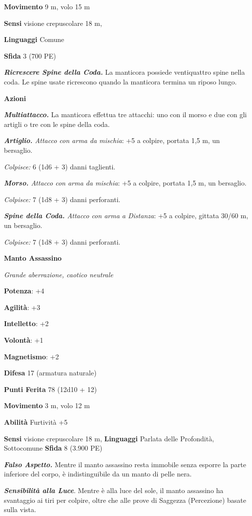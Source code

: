 \begin{multicols}{2}
\textbf{Movimento} 9 m, volo 15 m

\textbf{Sensi} visione crepuscolare 18 m, 

\textbf{Linguaggi} Comune

\textbf{Sfida} 3 (700 PE)

\emph{\textbf{Ricrescere Spine della Coda.}} La manticora possiede
ventiquattro spine nella coda. Le spine usate ricrescono quando la
manticora termina un riposo lungo.

\textbf{Azioni}

\emph{\textbf{Multiattacco.}} La manticora effettua tre attacchi: uno
con il morso e due con gli artigli o tre con le spine della coda.

\emph{\textbf{Artiglio.} Attacco con arma da mischia}: +5 a colpire,
portata 1,5 m, un bersaglio.

\emph{Colpisce:} 6 (1d6 + 3) danni taglienti.

\emph{\textbf{Morso.} Attacco con arma da mischia}: +5 a colpire,
portata 1,5 m, un bersaglio.

\emph{Colpisce:} 7 (1d8 + 3) danni perforanti.

\emph{\textbf{Spine della Coda.} Attacco con arma a Distanza}: +5 a
colpire, gittata 30/60 m, un bersaglio.

\emph{Colpisce:} 7 (1d8 + 3) danni perforanti.


\textbf{Manto Assassino}

\emph{Grande aberrazione, caotico neutrale}

\textbf{Potenza}: +4

\textbf{Agilità}: +3

\textbf{Intelletto}: +2

\textbf{Volontà}: +1

\textbf{Magnetismo}: +2

\textbf{Difesa} 17 (armatura naturale)

\textbf{Punti Ferita} 78 (12d10 + 12)

\textbf{Movimento} 3 m, volo 12 m

\textbf{Abilità} Furtività +5

\textbf{Sensi} visione crepuscolare 18 m, 
\textbf{Linguaggi} Parlata delle Profondità, Sottocomune \textbf{Sfida}
8 (3.900 PE)

\emph{\textbf{Falso Aspetto.}} Mentre il manto assassino resta immobile
senza esporre la parte inferiore del corpo, è indistinguibile da un
manto di pelle nera.

\emph{\textbf{Sensibilità alla Luce}}. Mentre è alla luce del sole, il
manto assassino ha svantaggio ai tiri per colpire, oltre che alle prove
di Saggezza (Percezione) basate sulla vista.


\end{multicols}
